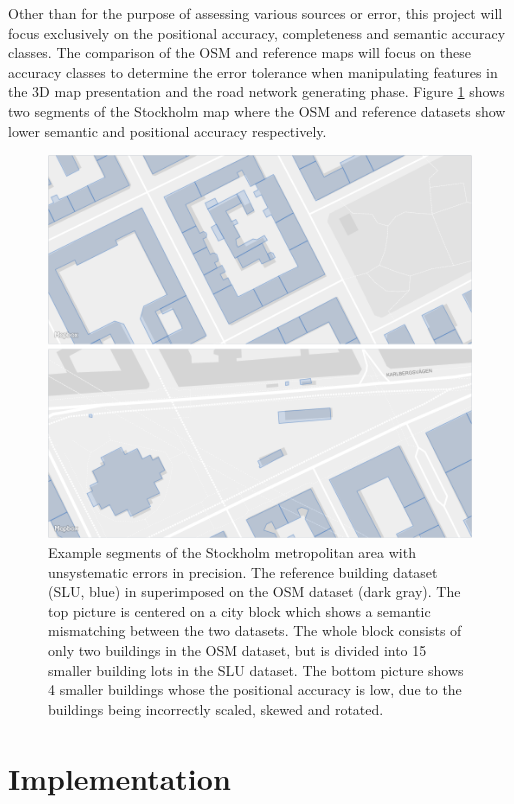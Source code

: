 \documentclass{kththesis}
\begin{document}
Other than for the purpose of assessing various sources or error, this project will focus exclusively on the positional accuracy, completeness and semantic accuracy classes.
The comparison of the OSM and reference maps will focus on these accuracy classes to determine the error tolerance when manipulating features in the 3D map presentation and the road network generating phase.
Figure \ref{fig:osm-slu-map} shows two segments of the Stockholm map where the OSM and reference datasets show lower semantic and positional accuracy respectively.

\begin{figure}[H]
    \centering
    \includegraphics[width=\textwidth,height=0.5\textheight,keepaspectratio]{img_map_compare}
    \caption{Example segments of the Stockholm metropolitan area with unsystematic errors in precision. The reference building dataset (SLU, blue) in superimposed on the OSM dataset (dark gray). The top picture is centered on a city block which shows a semantic mismatching between the two datasets. The whole block consists of only two buildings in the OSM dataset, but is divided into 15 smaller building lots in the SLU dataset. The bottom picture shows 4 smaller buildings whose the positional accuracy is low, due to the buildings being incorrectly scaled, skewed and rotated.}
    \label{fig:osm-slu-map}
\end{figure}

\chapter{Implementation}
\end{document}
